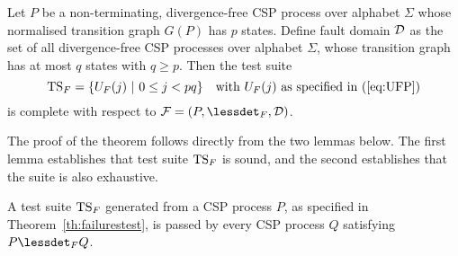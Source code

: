 \begin{theorem}\label{th:failurestest}
Let $P$ be a non-terminating, divergence-free CSP process over alphabet $\Sigma$ whose
normalised transition graph $G(P)$ has $p$ states. Define fault domain ${\cal
D}$ as the set of all divergence-free CSP processes over alphabet $\Sigma$,
whose transition graph has at most $q$ states with $q \ge p$. Then the test
suite
\[
{\text{TS}}_F = \{ U_F(j)~|~0 \le j < pq  \}\quad\text{with $U_F(j)$ as specified in (\ref{eq:UFP})}
\]
is complete with respect to ${\cal F} = (P,\lessdet_F,{\cal D})$.
\end{theorem}
%
The proof of the theorem follows directly from the two lemmas below. The
first lemma establishes that test suite ${\text{TS}}_F$ is sound, and the second
establishes that the suite is also exhaustive.
%
\begin{lemma}\label{lemma:mainfsound}
A test suite ${\text{TS}}_F$ generated from a CSP process $P$, as specified in
Theorem~\ref{th:failurestest}, is passed by every CSP process $Q$ satisfying
$P\lessdet_F Q$.
\end{lemma}
